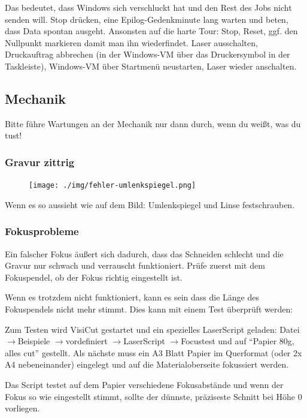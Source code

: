 \documentclass{\basedir/fablab-document}
\newcommand{\pfeil}{\ensuremath{\rightarrow}}
\begin{document}
	Das bedeutet, dass Windows sich verschluckt hat und den Rest des Jobs nicht senden will. Stop drücken, eine Epilog-Gedenkminute lang warten und beten, dass Data spontan ausgeht. Ansonsten auf die harte Tour: Stop, Reset, ggf. den Nullpunkt markieren damit man ihn wiederfindet. Laser ausschalten, Druckauftrag abbrechen (in der Windows-VM über das Druckersymbol in der Taskleiste), Windows-VM über Startmenü neustarten, Laser wieder anschalten.

	\subsection{Mechanik}
	Bitte führe Wartungen an der Mechanik nur dann durch, wenn du weißt, was du tust!

	\subsubsection{Gravur zittrig}
	\begin{figure}
		\vspace{-50pt} %
		\texttt{[image: ./img/fehler-umlenkspiegel.png]}
		\vspace{-20pt} %
	\end{figure}
	Wenn es so aussieht wie auf dem Bild: Umlenkspiegel und Linse festschrauben.

	\subsubsection{Fokusprobleme}
	Ein falscher Fokus äußert sich dadurch, dass das Schneiden schlecht und die Gravur nur schwach und verrauscht funktioniert. Prüfe zuerst mit dem Fokuspendel, ob der Fokus richtig eingestellt ist.

	Wenn es trotzdem nicht funktioniert, kann es sein dass die Länge des Fokuspendels nicht mehr stimmt. Dies kann mit einem Test überprüft werden:

	Zum Testen wird VisiCut gestartet und ein spezielles LaserScript geladen: Datei \pfeil Beispiele \pfeil vordefiniert \pfeil LaserScript \pfeil Focustest und auf \enquote{Papier 80g, alles cut} gestellt.
	Als nächste muss ein A3 Blatt Papier im Querformat (oder 2x A4 nebeneinander) eingelegt und auf die Materialoberseite fokussiert werden.

	Das Script testet auf dem Papier verschiedene Fokusabstände und wenn der Fokus so wie eingestellt stimmt, sollte der dünnste, präziseste Schnitt bei Höhe 0 vorliegen.
\end{document}
